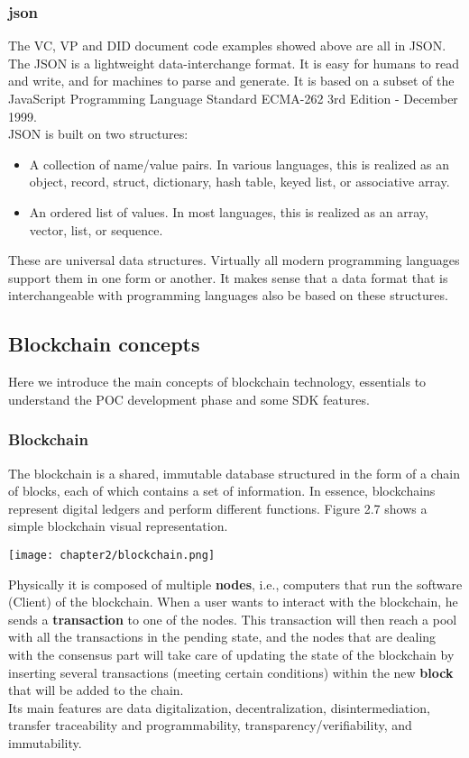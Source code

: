 \subsubsection{\acrfull{json}}
\label{subsubsec:json}
The VC, VP and DID document code examples showed above are all in JSON.\\
The JSON\cite{site:json} is a lightweight data-interchange format. It is easy for humans to read and 
write, and for machines to parse and generate. It is based on a subset of the JavaScript
Programming Language Standard ECMA-262 3rd Edition - December 1999.\\
JSON is built on two structures:
\begin{itemize}
    \item A collection of name/value pairs. In various languages, this is realized as an 
    object, record, struct, dictionary, hash table, keyed list, or associative array.
    \item An ordered list of values. In most languages, this is realized as an array, 
    vector, list, or sequence.
\end{itemize}
These are universal data structures. Virtually all modern programming languages support 
them in one form or another. It makes sense that a data format that is interchangeable 
with programming languages also be based on these structures.
\subsection{Blockchain concepts}
Here we introduce the main concepts of blockchain technology, essentials to 
understand the POC development phase and some SDK features.
\subsubsection{Blockchain}
The blockchain is a shared, immutable database structured in the form of a chain of 
blocks, each of which contains a set of information. In essence, blockchains represent 
digital ledgers and perform different functions. Figure 2.7 shows a simple blockchain 
visual representation.
\begin{center}
    \texttt{[image: chapter2/blockchain.png]}
\end{center}
Physically it is composed of multiple \textbf{nodes}, i.e., computers that run the software 
(Client) of the blockchain. When a user wants to interact with the blockchain, he 
sends a \textbf{transaction} to one of the nodes. This transaction will then reach a pool with 
all the transactions in the pending state, and the nodes that are dealing with the 
consensus part will take care of updating the state of the blockchain by inserting 
several transactions (meeting certain conditions) within the new \textbf{block} that will
be added to the chain.\\
Its main features are data digitalization, decentralization, disintermediation, 
transfer traceability and programmability, transparency/verifiability, and immutability.
